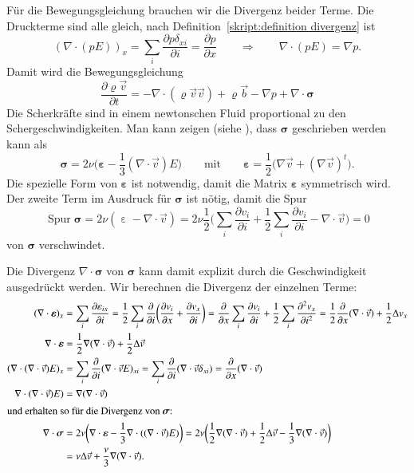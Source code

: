 Für die Bewegungsgleichung brauchen wir die Divergenz beider Terme.
Die Druckterme sind alle gleich, nach
Definition~\ref{skript:definition divergenz} ist
\[
(\nabla\cdot(pE))_x
=
\sum_i
\frac{\partial p\delta_{xi}}{\partial i}
=
\frac{\partial p}{\partial x}
\qquad\Rightarrow\qquad
\nabla\cdot(pE)
=
\nabla p.
\]
Damit wird die Bewegungsgleichung 
\begin{equation}
\frac{\partial \varrho\vec{v}}{\partial t}
=
-\nabla\cdot(\varrho\vec{v}\vec{v})
+\varrho\vec b
-\nabla p
+\nabla\cdot\bm{\sigma}
\label{skript:navier-stokes2}
\end{equation}
Die Scherkräfte sind in einem newtonschen Fluid proportional zu
den Schergeschwindigkeiten.
Man kann zeigen (siehe \cite[p.~172]{skript:kaperengler}), dass $\bm{\sigma}$
geschrieben werden kann als
\[
\bm{\sigma}
=
2\nu\biggl(\bm{\varepsilon} - \frac13(\nabla\cdot\vec{v})E\biggr)
\qquad\text{mit}\qquad
\bm{\varepsilon}=\frac12\bigl(\nabla\vec{v}+(\nabla\vec{v})^t\bigr).
\]
Die spezielle Form von $\bm{\varepsilon}$ ist notwendig, damit die Matrix
$\bm{\varepsilon}$ symmetrisch wird.
Der zweite Term im Ausdruck für $\bm{\sigma}$ ist nötig, damit die Spur
\[
\operatorname{Spur}{\bm{\sigma}}
=
2\nu(\operatorname{\varepsilon} - \nabla\cdot\vec{v})
=
2\nu
\frac12
\biggl(
\sum_i \frac{\partial v_i}{\partial i}
+
\frac12
\sum_i \frac{\partial v_i}{\partial i}
-
\nabla\cdot\vec{v}
\biggr)
=
0
\]
von $\bm{\sigma}$ verschwindet.

Die Divergenz $\nabla\cdot\bm{\sigma}$ von $\bm{\sigma}$ kann damit explizit
durch die Geschwindigkeit ausgedrückt werden.
Wir berechnen die Divergenz der einzelnen Terme:
\begin{align}
(\nabla\cdot\bm{\varepsilon})_x
&=
\sum_i\frac{\partial \varepsilon_{ix}}{\partial i}
=
\frac12
\sum_i\frac{\partial}{\partial i}\biggl(
\frac{\partial v_i}{\partial x}+\frac{\partial v_x}{\partial i}
\biggr)
=
\frac{\partial}{\partial x}
\sum_i\frac{\partial v_i}{\partial i}
+
\frac12
\sum_i \frac{\partial^2 v_x}{\partial i^2}
=
\frac12\frac{\partial}{\partial x}
(\nabla\cdot\vec{v})
+
\frac12\Delta v_x
\notag
\\
\nabla\cdot\bm{\varepsilon}
&=
\frac12\nabla(\nabla\cdot\vec{v})
+
\frac12\Delta\vec{v}
\notag
\\
(\nabla\cdot(\nabla\cdot\vec{v})E)_x
&=
\sum_i \frac{\partial}{\partial i} (\nabla\cdot\vec{v}E)_{xi}
=
\sum_i \frac{\partial}{\partial i} (\nabla\cdot\vec{v}\delta_{xi})
=
\frac{\partial}{\partial x}(\nabla\cdot\vec{v})
\notag
\\
\nabla\cdot(\nabla\cdot\vec{v})E)
&=
\nabla(\nabla\cdot\vec v)
\notag
\\
\intertext{und erhalten so für die Divergenz von $\bm{\sigma}$:}
\nabla\cdot\bm{\sigma}
&=
2\nu\biggl(
\nabla\cdot\bm{\varepsilon}
-\frac13\nabla\cdot((\nabla\cdot\vec{v})E)
\biggr)
=
2\nu\biggl(
\frac12
\nabla(\nabla\cdot\vec{v})
+
\frac12\Delta\vec{v}
-\frac13
\nabla(\nabla\cdot\vec{v})
\biggr)
\\
&=
\nu\Delta\vec{v}
+\frac{\nu}3\nabla(\nabla\cdot\vec{v}).
\label{skript:sigmadiv}
\end{align}


